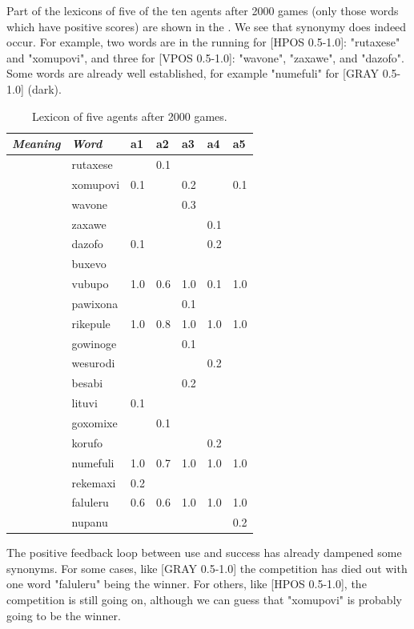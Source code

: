 Part of the lexicons of five of the ten agents after 2000 games 
(only those words which have positive scores) are shown in the 
. We see that synonymy does indeed occur. For
example, two words are in the 
running for [HPOS 0.5-1.0]: "rutaxese" and "xomupovi", and 
three for [VPOS 0.5-1.0]: "wavone", "zaxawe", and 
"dazofo". Some words are already well established, for
example "numefuli" for [GRAY 0.5-1.0] (dark). 
\begin{table}
\begin{center}
\begin{tabular}{ l  l  l  l  l  l  l  } \hline
{\it Meaning}&{\it Word}&{\bf a1}&{\bf a2}&{\bf a3}&{\bf a4}&{\bf a5} \\ \hline
[HPOS 0.5-1.0]&rutaxese& &0.1& & &\\ \hline
 & xomupovi&0.1& &0.2& &0.1\\ \hline
[VPOS 0.5-1.0]&wavone& & &0.3& &\\ \hline
 & zaxawe& & & &0.1& \\ \hline
 & dazofo&0.1& & &0.2&\\ \hline
[WIDTH 0.0-0.5]&buxevo& & & & & \\ \hline
 & vubupo&1.0&0.6&1.0&0.1&1.0\\ \hline
[WIDTH 0.5-1.0]&pawixona& & &0.1& & \\ \hline
 & rikepule&1.0&0.8&1.0&1.0&1.0\\ \hline
[WIDTH 0.5-0.75]&gowinoge& & &0.1& &  \\ \hline
 & wesurodi& & & &0.2&\\ \hline
[WIDTH 0.75-1.0]&besabi& & &0.2& & \\ \hline
 & lituvi&0.1& & & & \\ \hline
[GRAY 0.5-0.75]&goxomixe& &0.1& & & \\ \hline
 & korufo& & & &0.2&\\ \hline
[GRAY 0.0-0.5]&numefuli&1.0&0.7&1.0&1.0&1.0\\ \hline
[GRAY 0.0-0.25]&rekemaxi&0.2& & & & \\ \hline
[GRAY 0.5-1.0]&faluleru&0.6&0.6&1.0&1.0&1.0\\ \hline
 & nupanu& & & & &0.2 \\ \hline
\end{tabular}
\caption{\label{tab:lex2000} Lexicon of five agents after 2000 games.}
\end{center}
\end{table}

The positive feedback loop between use and success
has already dampened some synonyms. For some cases, like [GRAY 0.5-1.0] the competition has died out 
with one word "faluleru" being the winner. 
For others, like [HPOS 0.5-1.0], the competition 
is still going on, although we can guess
that "xomupovi" is probably going to be the winner. 

